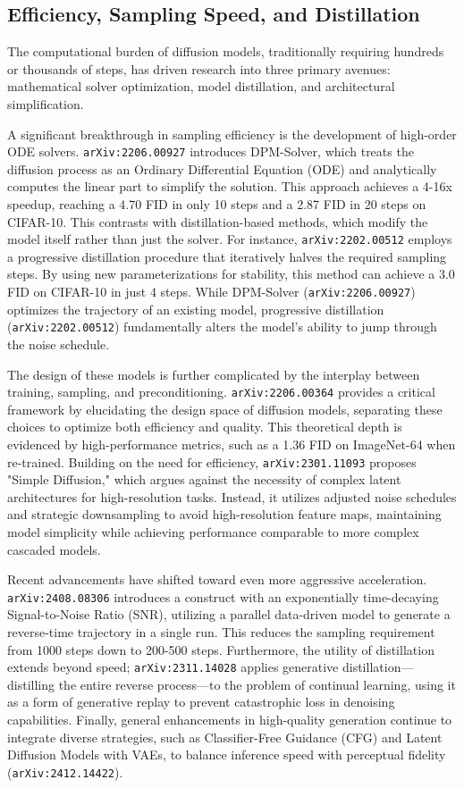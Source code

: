 \documentclass[11pt]{article}
\begin{document}
\subsection{Efficiency, Sampling Speed, and Distillation}

The computational burden of diffusion models, traditionally requiring hundreds or thousands of steps, has driven research into three primary avenues: mathematical solver optimization, model distillation, and architectural simplification.

A significant breakthrough in sampling efficiency is the development of high-order ODE solvers. \texttt{arXiv:2206.00927} introduces DPM-Solver, which treats the diffusion process as an Ordinary Differential Equation (ODE) and analytically computes the linear part to simplify the solution. This approach achieves a 4-16x speedup, reaching a 4.70 FID in only 10 steps and a 2.87 FID in 20 steps on CIFAR-10. This contrasts with distillation-based methods, which modify the model itself rather than just the solver. For instance, \texttt{arXiv:2202.00512} employs a progressive distillation procedure that iteratively halves the required sampling steps. By using new parameterizations for stability, this method can achieve a 3.0 FID on CIFAR-10 in just 4 steps. While DPM-Solver (\texttt{arXiv:2206.00927}) optimizes the trajectory of an existing model, progressive distillation (\texttt{arXiv:2202.00512}) fundamentally alters the model's ability to jump through the noise schedule.

The design of these models is further complicated by the interplay between training, sampling, and preconditioning. \texttt{arXiv:2206.00364} provides a critical framework by elucidating the design space of diffusion models, separating these choices to optimize both efficiency and quality. This theoretical depth is evidenced by high-performance metrics, such as a 1.36 FID on ImageNet-64 when re-trained. Building on the need for efficiency, \texttt{arXiv:2301.11093} proposes "Simple Diffusion," which argues against the necessity of complex latent architectures for high-resolution tasks. Instead, it utilizes adjusted noise schedules and strategic downsampling to avoid high-resolution feature maps, maintaining model simplicity while achieving performance comparable to more complex cascaded models.

Recent advancements have shifted toward even more aggressive acceleration. \texttt{arXiv:2408.08306} introduces a construct with an exponentially time-decaying Signal-to-Noise Ratio (SNR), utilizing a parallel data-driven model to generate a reverse-time trajectory in a single run. This reduces the sampling requirement from 1000 steps down to 200-500 steps. Furthermore, the utility of distillation extends beyond speed; \texttt{arXiv:2311.14028} applies generative distillation—distilling the entire reverse process—to the problem of continual learning, using it as a form of generative replay to prevent catastrophic loss in denoising capabilities. Finally, general enhancements in high-quality generation continue to integrate diverse strategies, such as Classifier-Free Guidance (CFG) and Latent Diffusion Models with VAEs, to balance inference speed with perceptual fidelity (\texttt{arXiv:2412.14422}).
\end{document}
